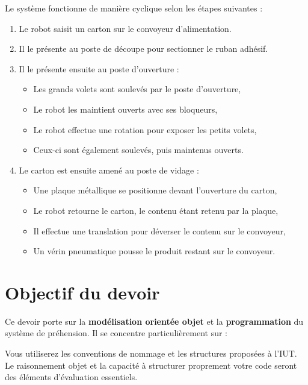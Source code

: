 Le système fonctionne de manière cyclique selon les étapes suivantes :
\begin{enumerate}
    \item Le robot saisit un carton sur le convoyeur d'alimentation.
    \item Il le présente au poste de découpe pour sectionner le ruban adhésif.
    \item Il le présente ensuite au poste d'ouverture :
    \begin{itemize}
        \item Les grands volets sont soulevés par le poste d'ouverture,
        \item Le robot les maintient ouverts avec ses bloqueurs,
        \item Le robot effectue une rotation pour exposer les petits volets,
        \item Ceux-ci sont également soulevés, puis maintenus ouverts.
    \end{itemize}
    \item Le carton est ensuite amené au poste de vidage :
    \begin{itemize}
        \item Une plaque métallique se positionne devant l’ouverture du carton,
        \item Le robot retourne le carton, le contenu étant retenu par la plaque,
        \item Il effectue une translation pour déverser le contenu sur le convoyeur,
        \item Un vérin pneumatique pousse le produit restant sur le convoyeur.
    \end{itemize}
\end{enumerate}

\section*{Objectif du devoir}

Ce devoir porte sur la \textbf{modélisation orientée objet} et la \textbf{programmation} du système de préhension. Il se concentre particulièrement sur :

Vous utiliserez les conventions de nommage et les structures proposées à l’IUT. Le raisonnement objet et la capacité à structurer proprement votre code seront des éléments d’évaluation essentiels.

